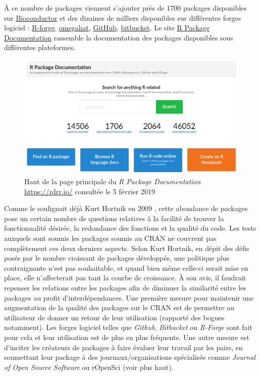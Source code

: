 \documentclass[]{article}
\begin{document}
À ce nombre de packages viennent s'ajouter près de 1700 packages disponibles sur \href{https://www.bioconductor.org/}{Bioconductor} et des dizaines de milliers disponibles
sur différentes forges logiciel : \href{https://r-forge.r-project.org/}{R-forge}, \href{http://www.omegahat.net/}{omegahat}, \href{https://github.com/}{GitHub}, \href{https://bitbucket.org/}{bitbucket}. Le site \href{https://rdrr.io/}{R Package Documentation} rassemble la documentation des packages disponibles sous différentes plateformes.

\begin{figure}
\centering
\includegraphics{img/chap2/rdrr.png}
\caption{Haut de la page principale du \emph{R Package Documentation} \url{https://rdrr.io/} consultée le 5 février 2019}
\end{figure}

Comme le soulignait déjà Kurt Hortnik en 2009 \citep{hornik_are_2012}, cette abondance de packages pose un certain nombre de questions relatives à la facilité de trouver la fonctionnalité désirée, la redondance des fonctions et la qualité du code. Les tests auxquels sont soumis les packages soumis au CRAN ne couvrent pas complètement ces deux derniers aspects. Selon Kurt Hortnik, en dépit des défis posés par le nombre croissant de packages développés, une politique plus contraignante n'est pas souhaitable, et quand bien même celle-ci serait mise en place, elle n'affecterait pas tant la courbe de croissance. À son avis, il faudrait repenser les relations entre les packages afin de diminuer la similarité entre les packages au profit d'interdépendances. Une première mesure pour maintenir une augmentation de la qualité des packages sur le CRAN est de permettre au utilisateur de donner un retour de leur utilisation (rapporté des bogues notamment). Les forges logiciel telles que \emph{Github}, \emph{Bitbucket} ou \emph{R-Forge} sont fait pour cela et leur utilisation est de plus en plus fréquente. Une autre mesure est d'inciter les créateurs de packages à faire évaluer leur travail par les pairs, en soumettant leur package à des journaux/organisations spécialisée comme \emph{Journal of Open Source Software} ou rOpenSci (voir plus haut).
\end{document}

